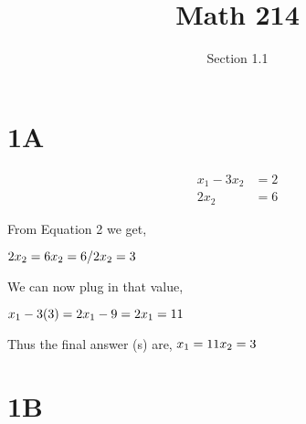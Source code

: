 \documentclass{article}
\begin{document}
    
\title{Math 214}
\author{Section 1.1}
\date{}
\maketitle %

\section*{1A}  
 
    \begin{align}
        x_1 - 3x_2 & = 2  \\ %
        2x_2  & = 6  %
    \end{align}

\raggedright From Equation 2 we get, \newline

    \begin{math}
         2x_2 = 6 
         \newline %
         x_2 = 6/2 
         \newline
         x_2 = 3
    \end{math} \newline

\raggedright We can now plug in that value, \newline

    \begin{math}
         x_1 - 3(3) = 2  
         \newline 
         x_1 - 9 = 2
         \newline
         x_1 = 11
    \end{math} \newline

\raggedright Thus the final answer (s) are, \newline
    \begin{math}
        x_1 = 11 \newline
        x_2 = 3 
    \end{math}


\section*{1B}   

    \setcounter{equation}{0} %
    
\end{document}
